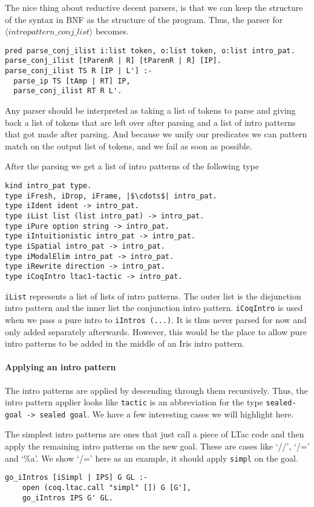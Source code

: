 \documentclass[thesis.tex]{subfiles}
\begin{document}
The nice thing about reductive decent parsers, is that we can keep the structure of the syntax in BNF as the structure of the program. Thus, the parser for $\langle intropattern\_conj\_list\rangle$ becomes.
\begin{verbatim}
pred parse_conj_ilist i:list token, o:list token, o:list intro_pat.
parse_conj_ilist [tParenR | R] [tParenR | R] [IP].
parse_conj_ilist TS R [IP | L'] :-
  parse_ip TS [tAmp | RT] IP,
  parse_conj_ilist RT R L'.
\end{verbatim}
Any parser should be interpreted as taking a list of tokens to parse and giving back a list of tokens that are left over after parsing and a list of intro patterns that got made after parsing. And because we unify our predicates we can pattern match on the output list of tokens, and we fail as soon as possible.

After the parsing we get a list of intro patterns of the following type
\begin{verbatim}
kind intro_pat type.
type iFresh, iDrop, iFrame, |$\cdots$| intro_pat.
type iIdent ident -> intro_pat.
type iList list (list intro_pat) -> intro_pat.
type iPure option string -> intro_pat.
type iIntuitionistic intro_pat -> intro_pat.
type iSpatial intro_pat -> intro_pat.
type iModalElim intro_pat -> intro_pat.
type iRewrite direction -> intro_pat.
type iCoqIntro ltac1-tactic -> intro_pat.
\end{verbatim}
\texttt{iList} represents a list of lists of intro patterns. The outer list is the disjunction intro pattern and the inner list the conjunction intro pattern. \texttt{iCoqIntro} is used when we pass a pure intro to \texttt{iIntros (...)}. It is thus never parsed for now and only added separately afterwards. However, this would be the place to allow pure intro patterns to be added in the middle of an Iris intro pattern.

\paragraph*{Applying an intro pattern}
The intro patterns are applied by descending through them recursively. Thus, the intro pattern applier looks like  \texttt{tactic} is an abbreviation for the type \texttt{sealed-goal -> sealed goal}. We have a few interesting cases we will highlight here.

The simplest intro patterns are ones that just call a piece of LTac code and then apply the remaining intro patterns on the new goal. These are cases like `//', `/=' and `\%a'. We show `/=' here as an example, it should apply \texttt{simpl} on the goal.
\begin{verbatim}
go_iIntros [iSimpl | IPS] G GL :-
    open (coq.ltac.call "simpl" []) G [G'],
    go_iIntros IPS G' GL.
\end{verbatim}
\end{document}
